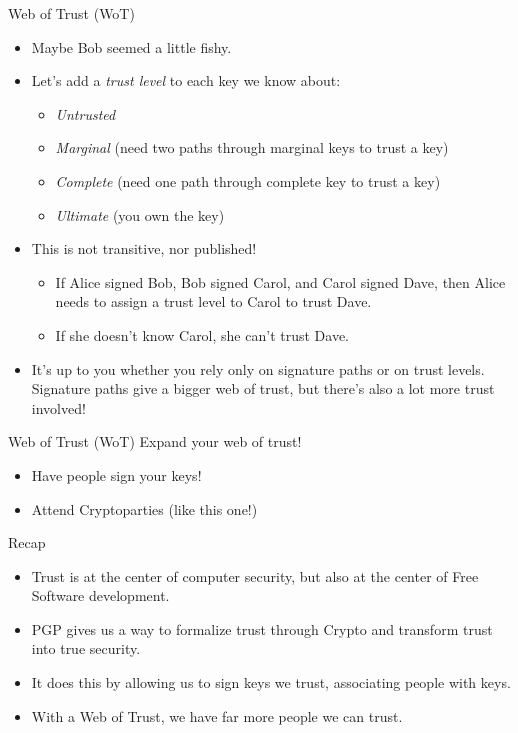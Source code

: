 \documentclass{beamer}
\begin{document}
\begin{frame}{Web of Trust (WoT)}
  \begin{itemize}
  \item Maybe Bob seemed a little fishy.
  \item Let's add a \textit{trust level} to each key we know about:
    \begin{itemize}
    \item\textit{Untrusted}
    \item\textit{Marginal} (need two paths through marginal keys to trust a key)
    \item\textit{Complete} (need one path through complete key to
      trust a key)
    \item\textit{Ultimate} (you own the key)
    \end{itemize}
  \item This is not transitive, nor published!
    \begin{itemize}
    \item If Alice signed Bob, Bob signed Carol, and Carol signed
      Dave, then Alice needs to assign a trust level to Carol to trust
      Dave.
    \item If she doesn't know Carol, she can't trust Dave.
    \end{itemize}
  \item It's up to you whether you rely only on signature paths or on
    trust levels.  Signature paths give a bigger web of trust, but
    there's also a lot more trust involved!
  \end{itemize}
\end{frame}

\begin{frame}{Web of Trust (WoT)}
  \Large Expand your web of trust!
  \normalsize
  \begin{itemize}
  \item Have people sign your keys!
  \item Attend Cryptoparties (like this one!)
  \end{itemize}
\end{frame}

\begin{frame}{Recap}
  \begin{itemize}
  \item Trust is at the center of computer security, but also at the
    center of Free Software development.
  \item PGP gives us a way to formalize trust through Crypto and
    transform trust into true security.
  \item It does this by allowing us to sign keys we trust, associating
    people with keys.
  \item With a Web of Trust, we have far more people we can trust.
  \end{itemize}
\end{frame}
\end{document}

